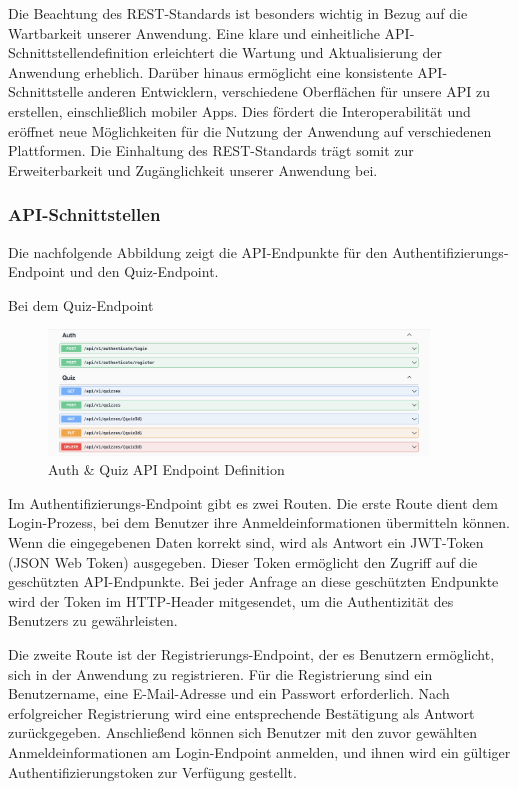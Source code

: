 \noindent Die Beachtung des REST-Standards ist besonders wichtig in Bezug auf die Wartbarkeit 
unserer Anwendung. Eine klare und einheitliche API-Schnittstellendefinition erleichtert die 
Wartung und Aktualisierung der Anwendung erheblich. Darüber hinaus ermöglicht eine konsistente 
API-Schnittstelle anderen Entwicklern, verschiedene Oberflächen für unsere API zu erstellen, 
einschließlich mobiler Apps. Dies fördert die Interoperabilität und eröffnet neue Möglichkeiten 
für die Nutzung der Anwendung auf verschiedenen Plattformen. Die Einhaltung des REST-Standards 
trägt somit zur Erweiterbarkeit und Zugänglichkeit unserer Anwendung bei.


\subsubsection{API-Schnittstellen}

Die nachfolgende Abbildung zeigt die API-Endpunkte für den Authentifizierungs-Endpoint und den Quiz-Endpoint.

\noindent Bei dem Quiz-Endpoint

\begin{figure}[H]
  \centering
  \includegraphics[width=0.9\textwidth]{img/Auth_Quiz-Endpoint.png}
  \caption{Auth \& Quiz API Endpoint Definition}
\end{figure}

\noindent Im Authentifizierungs-Endpoint gibt es zwei Routen. Die erste Route dient dem 
Login-Prozess, bei dem Benutzer ihre Anmeldeinformationen übermitteln können. Wenn die 
eingegebenen Daten korrekt sind, wird als Antwort ein JWT-Token (JSON Web Token) ausgegeben. 
Dieser Token ermöglicht den Zugriff auf die geschützten API-Endpunkte. Bei jeder Anfrage an 
diese geschützten Endpunkte wird der Token im HTTP-Header mitgesendet, um die Authentizität des 
Benutzers zu gewährleisten. \newline

\noindent Die zweite Route ist der Registrierungs-Endpoint, der es Benutzern ermöglicht, 
sich in der Anwendung zu registrieren. Für die Registrierung sind ein Benutzername, eine 
E-Mail-Adresse und ein Passwort erforderlich. Nach erfolgreicher Registrierung wird eine 
entsprechende Bestätigung als Antwort zurückgegeben. Anschließend können sich Benutzer mit den 
zuvor gewählten Anmeldeinformationen am Login-Endpoint anmelden, und ihnen wird ein gültiger 
Authentifizierungstoken zur Verfügung gestellt. \newline

